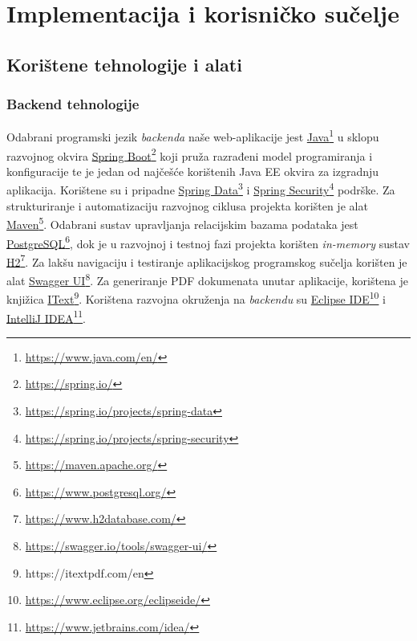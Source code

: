\chapter{Implementacija i korisničko sučelje}
		
		
		\section{Korištene tehnologije i alati}
		
			\subsection{Backend tehnologije}
			
			Odabrani programski jezik \textit{backenda} naše web-aplikacije jest \uline{Java}\footnote{\url{https://www.java.com/en/}} u sklopu razvojnog okvira \uline{Spring Boot}\footnote{\url{https://spring.io/}} koji pruža razrađeni model programiranja i konfiguracije te je jedan od najčešće korištenih Java EE okvira za izgradnju aplikacija. Korištene su i pripadne \uline{Spring Data}\footnote{\url{https://spring.io/projects/spring-data}} i \uline{Spring Security}\footnote{\url{https://spring.io/projects/spring-security}} podrške. Za strukturiranje i automatizaciju razvojnog ciklusa projekta korišten je alat \uline{Maven}\footnote{\url{https://maven.apache.org/}}. Odabrani sustav upravljanja relacijskim bazama podataka jest \uline{PostgreSQL}\footnote{\url{https://www.postgresql.org/}}, dok je u razvojnoj i testnoj fazi projekta korišten \textit{in-memory} sustav \uline{H2}\footnote{\url{https://www.h2database.com/}}. Za lakšu navigaciju i testiranje aplikacijskog programskog sučelja  korišten je alat \uline{Swagger UI}\footnote{\url{https://swagger.io/tools/swagger-ui/}}. Za generiranje PDF dokumenata unutar aplikacije,  korištena je knjižica \uline{IText}\footnote{https://itextpdf.com/en}. Korištena razvojna okruženja na \textit{backendu} su \uline{Eclipse IDE}\footnote{\url{https://www.eclipse.org/eclipseide/}} i \uline{IntelliJ IDEA}\footnote{\url{https://www.jetbrains.com/idea/}}.
			

